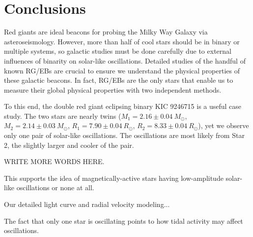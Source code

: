 \section{Conclusions}\label{conclude}
Red giants are ideal beacons for probing the Milky Way Galaxy via asteroseismology. However, more than half of cool stars should be in binary or multiple systems, so galactic studies must be done carefully due to external influences of binarity on solar-like oscillations. Detailed studies of the handful of known RG/EBs are crucial to ensure we understand the physical properties of these galactic beacons. In fact, RG/EBs are the only stars that enable us to measure their global physical properties with two independent methods.

To this end, the double red giant eclipsing binary KIC 9246715 is a useful case study. The two stars are nearly twins ($M_1 = 2.16 \pm 0.04\ M_{\odot}$, $M_2 = 2.14 \pm 0.03\ M_{\odot}$, $R_1 = 7.90 \pm 0.04 \ R_{\odot}$, $R_2 = 8.33 \pm 0.04 \ R_{\odot}$), yet we observe only one pair of solar-like oscillations. The oscillations are most likely from Star 2, the slightly larger and cooler of the pair.

WRITE MORE WORDS HERE.

This supports the idea of magnetically-active stars having low-amplitude solar-like oscillations or none at all.

Our detailed light curve and radial velocity modeling... 

The fact that only one star is oscillating points to how tidal activity may affect oscillations.


  